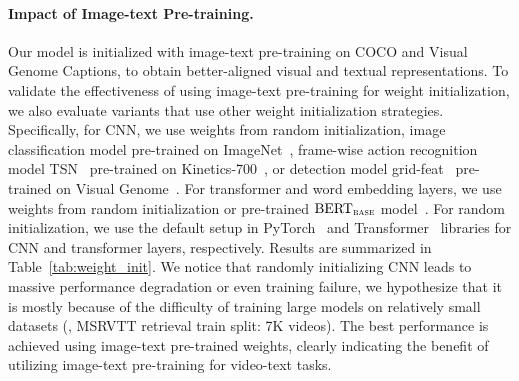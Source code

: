 \begin{table}[!t]
\caption{
Impact of \textbf{weight initialization strategy}.
}
\label{tab:weight_init}
\vspace{-3mm}
\end{table}



\paragraph{Impact of Image-text Pre-training.} 
Our model is initialized with image-text pre-training on COCO and Visual Genome Captions, to obtain better-aligned visual and textual representations.
To validate the effectiveness of using image-text pre-training for weight initialization, we also evaluate variants that use other weight initialization strategies. 
Specifically, for CNN, we use weights from random initialization, image classification model pre-trained on ImageNet~\cite{deng2009imagenet}, frame-wise action recognition model TSN~\cite{wang2016temporal,2020mmaction2} pre-trained on Kinetics-700~\cite{smaira2020short,carreira2017quo}, or detection model grid-feat~\cite{jiang2020defense} pre-trained on Visual Genome~\cite{krishna2017visual}. 
For transformer and word embedding layers, we use weights from random initialization or pre-trained $\text{BERT}_{\textsc{base}}$ model~\cite{devlin2018bert}.
For random initialization, we use the default setup in PyTorch~\cite{paszke2019pytorch} and Transformer~\cite{Wolf2019HuggingFacesTS} libraries for CNN and transformer layers, respectively.
Results are summarized in Table~\ref{tab:weight_init}.
We notice that randomly initializing CNN leads to massive performance degradation or even training failure, we hypothesize that it is mostly because of the difficulty of training large models on relatively small datasets (\eg, MSRVTT retrieval train split: 7K videos).
The best performance is achieved using image-text pre-trained weights, clearly indicating the benefit of utilizing image-text pre-training for video-text tasks.



